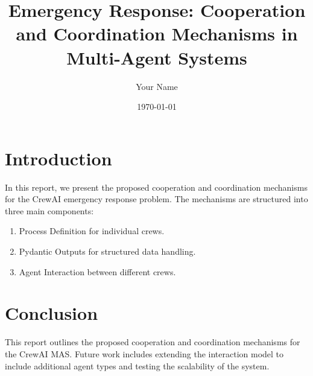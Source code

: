 \documentclass[12pt,a4paper]{article}
\title{Emergency Response: Cooperation and Coordination Mechanisms in Multi-Agent Systems}
\author{Your Name}
\date{\today}
\begin{document}
\maketitle
\tableofcontents
\newpage

\section{Introduction}
In this report, we present the proposed cooperation and coordination mechanisms for the CrewAI emergency response problem. The mechanisms are structured into three main components:
\begin{enumerate}
    \item Process Definition for individual crews.
    \item Pydantic Outputs for structured data handling.
    \item Agent Interaction between different crews.
\end{enumerate}











\section{Conclusion}
This report outlines the proposed cooperation and coordination mechanisms for the CrewAI MAS. Future work includes extending the interaction model to include additional agent types and testing the scalability of the system.
\end{document}
